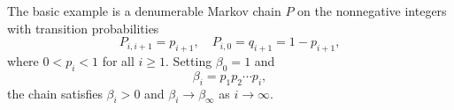 The basic example is a denumerable Markov chain $P$ on the nonnegative integers with transition probabilities
$$P_{i,i+1} = p_{i+1}, \quad P_{i,0} = q_{i+1} = 1 - p_{i+1},$$
where $0 < p_i < 1$ for all $i \geq 1$. Setting $\beta_0 = 1$ and
$$\beta_i = p_1 p_2 \cdots p_i,$$
the chain satisfies $\beta_i > 0$ and $\beta_i \to \beta_\infty$ as $i \to \infty$.
